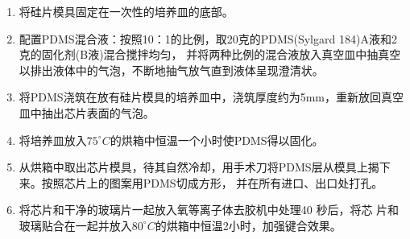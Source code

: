 	\begin{enumerate}[label={(\arabic*)},font={\color{black!50!black}\bfseries}]
	\item 将硅片模具固定在一次性的培养皿的底部。
	\item 配置PDMS混合液：按照10：1的比例，取20克的PDMS(Sylgard 184)A液和2克的固化剂(B液)混合搅拌均匀，
	并将两种比例的混合液放入真空皿中抽真空以排出液体中的气泡，不断地抽气放气直到液体呈现澄清状。
	\item 将PDMS浇筑在放有硅片模具的培养皿中，浇筑厚度约为5mm，重新放回真空皿中抽出芯片表面的气泡。
	\item 将培养皿放入$75^\circ C$的烘箱中恒温一个小时使PDMS得以固化。
	\item 从烘箱中取出芯片模具，待其自然冷却，用手术刀将PDMS层从模具上揭下来。按照芯片上的图案用PDMS切成方形，
	并在所有进口、出口处打孔。
	\item 将芯片和干净的玻璃片一起放入氧等离子体去胶机中处理40 秒后，将芯
片和玻璃贴合在一起并放入$80^\circ C$的烘箱中恒温2小时，加强键合效果。
	\end{enumerate}
